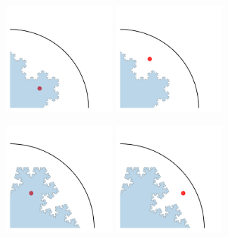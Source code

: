 \documentclass[9pt]{beamer}
\begin{document}
\begin{frame}[noframenumbering]
	\frametitle{}

	\begin{center}
	\includegraphics[height=4.0cm]{figs/int_convex.png}
	\includegraphics[height=4.0cm]{figs/ext_convex.png}
	\end{center}
	\begin{center}
	\includegraphics[height=4.0cm]{figs/int_concave.png}
	\includegraphics[height=4.0cm]{figs/ext_concave.png}
	\end{center}
	
\end{frame}





\begin{frame}[noframenumbering]




\end{frame}
\end{document}
